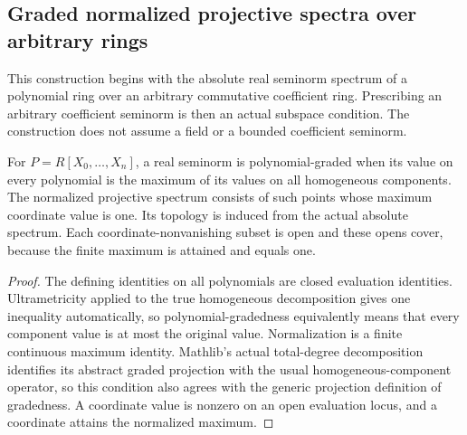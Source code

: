 \subsection{Graded normalized projective spectra over arbitrary rings}
\label{subsec:normalized-projective-spectra}

This construction begins with the absolute real seminorm spectrum of a
polynomial ring over an arbitrary commutative coefficient ring. Prescribing
an arbitrary coefficient seminorm is then an actual subspace condition.
The construction does not assume a field or a bounded coefficient seminorm.

\begin{definition}
\label{projective:general-normalized-spectrum}
\leanok
{}
For $P=R[X_0,\ldots,X_n]$, a real seminorm is polynomial-graded when its
value on every polynomial is the maximum of its values on all homogeneous
components. The normalized projective spectrum consists of such points
whose maximum coordinate value is one. Its topology is induced from the
actual absolute spectrum. Each coordinate-nonvanishing subset is open and
these opens cover, because the finite maximum is attained and equals one.
\end{definition}
\begin{proof}
The defining identities on all polynomials are closed evaluation identities.
Ultrametricity applied to the true homogeneous decomposition gives one
inequality automatically, so polynomial-gradedness equivalently means
that every component value is at most the original value. Normalization
is a finite continuous maximum identity. Mathlib's actual total-degree
decomposition identifies its abstract graded projection with the usual
homogeneous-component operator, so this condition also agrees with the
generic projection definition of gradedness. A coordinate value is nonzero on
an open evaluation locus, and a coordinate attains the normalized maximum.
\end{proof}

